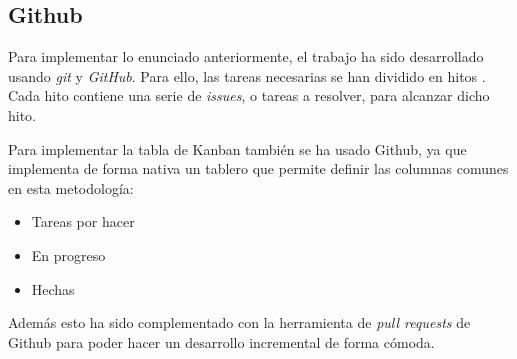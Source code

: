 \subsection{Github}

Para implementar lo enunciado anteriormente, el trabajo ha sido desarrollado usando \textit{git} y \textit{GitHub}.
Para ello, las tareas necesarias se han dividido en hitos \cite{milestones}. Cada hito contiene una
serie de \textit{issues}, o tareas a resolver, para alcanzar dicho hito.

Para implementar la tabla de Kanban también se ha usado Github, ya que implementa de forma nativa un
tablero que permite definir las columnas comunes en esta metodología:

\begin{itemize}
    \item Tareas por hacer
    \item En progreso
    \item Hechas
\end{itemize}

Además esto ha sido complementado con la herramienta de \textit{pull requests} de Github para poder hacer
un desarrollo incremental de forma cómoda.
